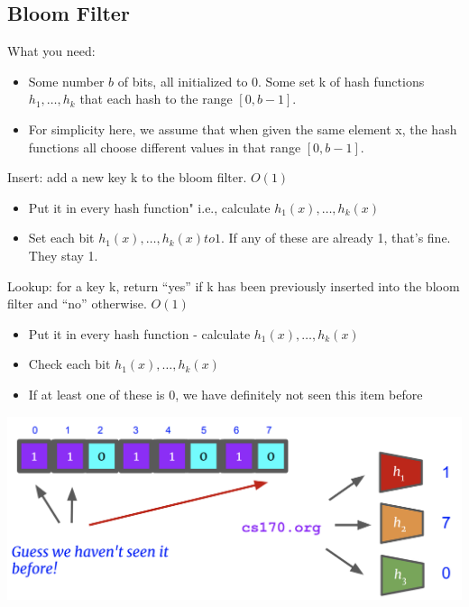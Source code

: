 \documentclass[12pt]{article}
\begin{document}
\subsection*{Bloom Filter}
What you need:
\begin{itemize}
    \item Some number $b$ of bits, all initialized to $0$.
    Some set k of hash functions $h_1, …, h_k$ that each hash to the range $[0, b-1]$.
    \item For simplicity here, we assume that when given the same element x, the hash functions all choose different values in that range $[0, b-1]$. 
\end{itemize}
Insert: add a new key k to the bloom filter. $O(1)$
\begin{itemize}
    \item Put it in every hash function" i.e., calculate $h_1
(x), …, h_k(x)$
    \item Set each bit $h_1(x), …, h_k(x) to 1$. If any of these are already 1, that's fine. They stay 1.
\end{itemize}
Lookup: for a key k, return “yes” if k has been previously
inserted into the bloom filter and “no” otherwise. $O(1)$
\begin{itemize}
    \item Put it in every hash function - calculate $h_1(x), …, h_k(x)$
    \item Check each bit $h_1(x), …, h_k(x)$
    \item If at least one of these is 0, we have definitely not seen this item before
\end{itemize}
\includegraphics[scale=0.5]{bloomfilter.png} 
\end{document}
